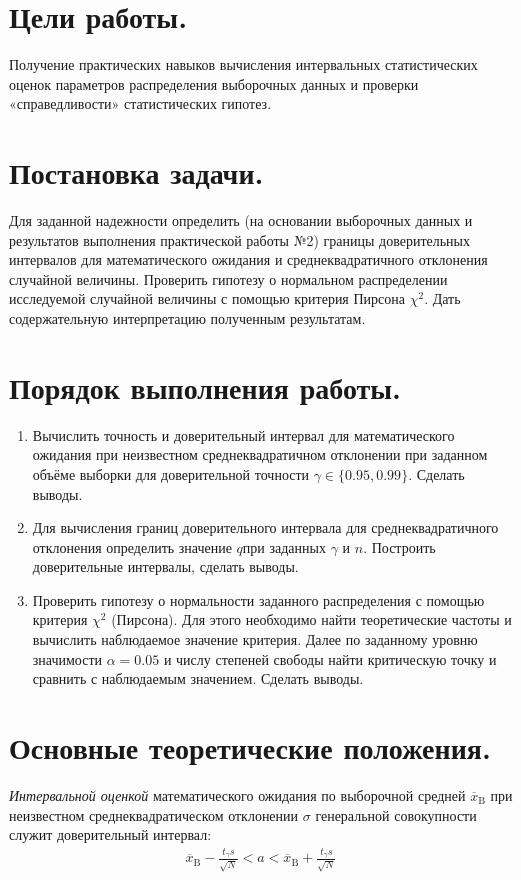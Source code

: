 \setcounter{page}{2}
\section*{Цели работы.}
Получение практических навыков вычисления интервальных статистических оценок параметров распределения выборочных данных и проверки «справедливости» статистических гипотез.

\section*{Постановка задачи.}
Для заданной надежности определить (на основании выборочных данных и результатов выполнения практической работы №2) границы доверительных интервалов для математического ожидания и среднеквадратичного отклонения случайной величины. Проверить гипотезу о нормальном распределении исследуемой случайной величины с помощью критерия Пирсона $\chi^2$.
Дать содержательную интерпретацию полученным результатам.

\section*{Порядок выполнения работы.}
\begin{enumerate}
    \item Вычислить точность и доверительный интервал для математического ожидания при неизвестном среднеквадратичном отклонении при заданном объёме выборки для доверительной точности $\gamma \in \{0.95, 0.99\}$.
    Сделать выводы.
    \item Для вычисления границ доверительного интервала для среднеквадратичного отклонения определить значение $q$при заданных $\gamma$ и $n$.
    Построить доверительные интервалы, сделать выводы.
    \item Проверить гипотезу о нормальности заданного распределения с помощью критерия $\chi^2$ (Пирсона). Для этого необходимо найти теоретические частоты и вычислить наблюдаемое значение критерия. Далее по заданному уровню значимости $\alpha = 0.05$ и числу степеней свободы найти критическую точку и сравнить с наблюдаемым значением. Сделать выводы.
\end{enumerate}

\section*{Основные теоретические положения.}
\textit{Интервальной оценкой} математического ожидания по выборочной
средней $\overline{x}_\text{B}$
при неизвестном среднеквадратическом отклонении $\sigma$ генеральной
совокупности служит доверительный интервал:
\begin{gather*}
    \overline{x}_\text{B} - \frac{t_\gamma s}{\sqrt{N}} < a < \overline{x}_\text{B} + \frac{t_\gamma s}{\sqrt{N}}
\end{gather*}

